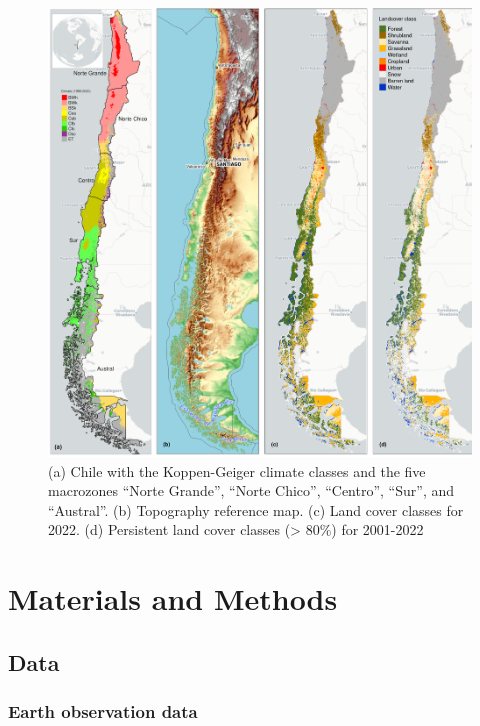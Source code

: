 \documentclass[
  number,
  preprint,
  3p,
  onecolumn]{elsarticle}
\begin{document}
\begin{figure}[!ht]

{\centering \includegraphics{../output/figs/map_study_con_landcover.png}

}

\caption{\label{fig-studyArea}(a) Chile with the Koppen-Geiger climate
classes and the five macrozones ``Norte Grande'', ``Norte Chico'',
``Centro'', ``Sur'', and ``Austral''. (b) Topography reference map. (c)
Land cover classes for 2022. (d) Persistent land cover classes
(\textgreater{} 80\%) for 2001-2022}

\end{figure}

\hypertarget{materials-and-methods}{%
\section{Materials and Methods}\label{materials-and-methods}}

\hypertarget{data}{%
\subsection{Data}\label{data}}

\hypertarget{earth-observation-data}{%
\subsubsection{Earth observation data}\label{earth-observation-data}}
\end{document}
